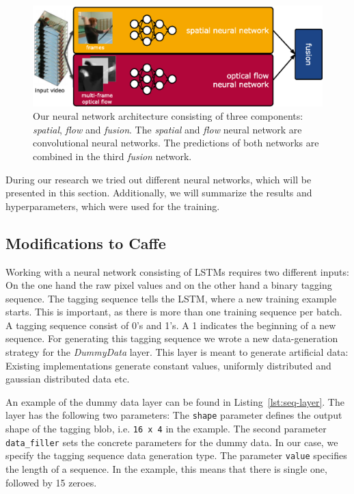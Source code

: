 \begin{figure}[!htb]
	\centering
	\includegraphics[scale=.7]{images/net_architecture.eps}
	\caption{Our neural network architecture consisting of three components: \emph{spatial}, \emph{flow} and \emph{fusion}. The \emph{spatial} and \emph{flow} neural network are convolutional neural networks. The predictions of both networks are combined in the third \emph{fusion} network.}
	\label{fig:architecture}
\end{figure}

During our research we tried out different neural networks, which will be presented in this section.
Additionally, we will summarize the results and hyperparameters, which were used for the training.

\subsection{Modifications to Caffe}

Working with a neural network consisting of LSTMs requires two different inputs:
On the one hand the raw pixel values and on the other hand a binary tagging sequence.
The tagging sequence tells the LSTM, where a new training example starts.
This is important, as there is more than one training sequence per batch.
A tagging sequence consist of 0's and 1's.
A 1 indicates the beginning of a new sequence.
For generating this tagging sequence we wrote a new data-generation strategy for the \emph{DummyData} layer.
This layer is meant to generate artificial data: Existing implementations generate constant values, uniformly distributed and gaussian distributed data etc.

An example of the dummy data layer can be found in Listing~\ref{lst:seq-layer}.
The layer has the following two parameters:
The \texttt{shape} parameter defines the output shape of the tagging blob, i.e. \texttt{16 x 4} in the example.
The second parameter \texttt{data\_filler} sets the concrete parameters for the dummy data.
In our case, we specify the tagging sequence data generation type.
The parameter \texttt{value} specifies the length of a sequence.
In the example, this means that there is single one, followed by 15 zeroes.

